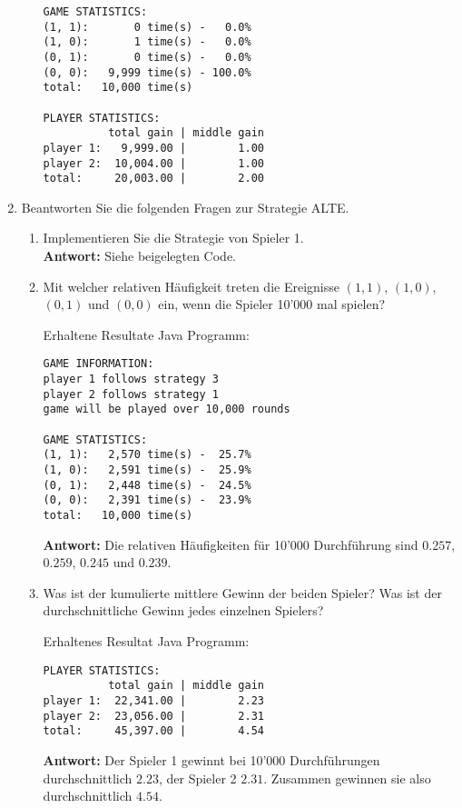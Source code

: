 \documentclass[12pt,a4paper]{article}
\begin{document}
\begin{enumerate}
\begin{enumerate}
\begin{verbatim}
GAME STATISTICS:
(1, 1):       0 time(s) -   0.0%
(1, 0):       1 time(s) -   0.0%
(0, 1):       0 time(s) -   0.0%
(0, 0):   9,999 time(s) - 100.0%
total:   10,000 time(s)

PLAYER STATISTICS:
          total gain | middle gain
player 1:   9,999.00 |        1.00
player 2:  10,004.00 |        1.00
total:     20,003.00 |        2.00
\end{verbatim}
\end{enumerate}
\newpage
\item Beantworten Sie die folgenden Fragen zur Strategie ALTE.
\begin{enumerate}
\item Implementieren Sie die Strategie von Spieler 1.\\
\textbf{Antwort:} Siehe beigelegten Code.

\item Mit welcher relativen Häufigkeit treten die Ereignisse $(1, 1)$, $(1, 0)$, $(0, 1)$ und $(0, 0)$ ein, wenn die Spieler 10'000 mal spielen?\\
\begin{center}Erhaltene Resultate Java Programm:\end{center}
\begin{verbatim}
GAME INFORMATION:
player 1 follows strategy 3
player 2 follows strategy 1
game will be played over 10,000 rounds

GAME STATISTICS:
(1, 1):   2,570 time(s) -  25.7%
(1, 0):   2,591 time(s) -  25.9%
(0, 1):   2,448 time(s) -  24.5%
(0, 0):   2,391 time(s) -  23.9%
total:   10,000 time(s)
\end{verbatim}
\textbf{Antwort:} Die relativen Häufigkeiten für 10'000 Durchführung sind $0.257$, $0.259$, $0.245$ und $0.239$.

\item Was ist der kumulierte mittlere Gewinn der beiden Spieler?
Was ist der durchschnittliche Gewinn jedes einzelnen Spielers?
\begin{center}Erhaltenes Resultat Java Programm:\end{center}
\begin{verbatim}
PLAYER STATISTICS:
          total gain | middle gain
player 1:  22,341.00 |        2.23
player 2:  23,056.00 |        2.31
total:     45,397.00 |        4.54
\end{verbatim}
\textbf{Antwort:} Der Spieler 1 gewinnt bei 10'000 Durchführungen durchschnittlich $2.23$, der Spieler 2 $2.31$.
Zusammen gewinnen sie also durchschnittlich $4.54$.


\end{enumerate}
\end{enumerate}
\end{document}
